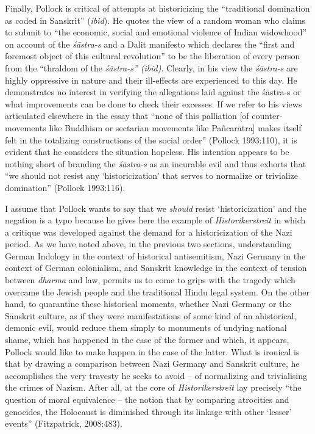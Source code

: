 Finally, Pollock is critical of attempts at historicizing the “traditional domination as coded in Sanskrit” ({\sl ibid}). He quotes the view of a random woman who claims to submit to “the economic, social and emotional violence of Indian widowhood” on account of the {\sl śāstra-s} and a Dalit manifesto which declares the “first and foremost object of this cultural revolution” to be the liberation of every person from the “thraldom of the {\sl śāstra-s” (ibid)}. Clearly, in his view the {\sl śāstra-s} are highly oppressive in nature and their ill-effects are experienced to this day. He demonstrates no interest in verifying the allegations laid against the śāstra-s or what improvements can be done to check their excesses. If we refer to his views articulated elsewhere in the essay that “none of this palliation [of counter-movements like Buddhism or sectarian movements like Pañcarātra] makes itself felt in the totalizing constructions of the social order” (Pollock 1993:110), it is evident that he considers the situation hopeless. His intention appears to be nothing short of branding the {\sl śāstra-s} as an incurable evil and thus exhorts that “we should not resist any ‘historicization’ that serves to normalize or trivialize domination” (Pollock 1993:116).

I assume that Pollock wants to say that we {\sl should} resist ‘historicization’ and the negation is a typo because he gives here the example of {\sl Historikerstreit} in which a critique was developed against the demand for a historicization of the Nazi period. As we have noted above, in the previous two sections, understanding German Indology in the context of historical antisemitism, Nazi Germany in the context of German colonialism, and Sanskrit knowledge in the context of tension between {\sl dharma} and law, permits us to come to grips with the tragedy which overcame the Jewish people and the traditional Hindu legal system. On the other hand, to quarantine these historical moments, whether Nazi Germany or the Sanskrit culture, as if they were manifestations of some kind of an ahistorical, demonic evil, would reduce them simply to monuments of undying national shame, which has happened in the case of the former and which, it appears, Pollock would like to make happen in the case of the latter. What is ironical is that by drawing a comparison between Nazi Germany and Sanskrit culture, he accomplishes the very travesty he seeks to avoid – of normalizing and trivialising the crimes of Nazism. After all, at the core of {\sl Historikerstreit} lay precisely “the question of moral equivalence – the notion that by comparing atrocities and genocides, the Holocaust is diminished through its linkage with other ‘lesser’ events” (Fitzpatrick, 2008:483).

